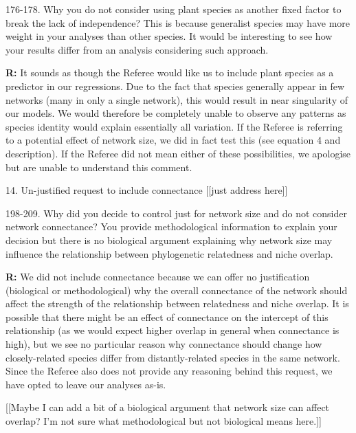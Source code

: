 \documentclass[12pt]{letter}
\newenvironment{refquote}{\bigskip \begin{it}}{\end{it}\smallskip}
\begin{document}
		\begin{refquote}
			176-178. Why you do not consider using plant species as another fixed factor to break the lack of independence? This is because generalist species may have more weight in your analyses than other species. It would be interesting to see how your results differ from an analysis considering such approach.
		\end{refquote}

		\textbf{R:} It sounds as though the Referee would like us to include plant species as a predictor in our regressions. Due to the fact that species generally appear in few networks (many in only a single network), this would result in near singularity of our models. We would therefore be completely unable to observe any patterns as species identity would explain essentially all variation. If the Referee is referring to a potential effect of network size, we did in fact test this (see equation 4 and description). If the Referee did not mean either of these possibilities, we apologise but are unable to understand this comment.


	14. Un-justified request to include connectance [[just address here]]

		\begin{refquote}
			198-209. Why did you decide to control just for network size and do not consider network connectance? You provide methodological information to explain your decision but there is no biological argument explaining why network size may influence the relationship between phylogenetic relatedness and niche overlap.
		\end{refquote}

		\textbf{R:} We did not include connectance because we can offer no justification (biological or methodological) why the overall connectance of the network should affect the strength of the relationship between relatedness and niche overlap. It is possible that there might be an effect of connectance on the intercept of this relationship (as we would expect higher overlap in general when connectance is high), but we see no particular reason why connectance should change how closely-related species differ from distantly-related species in the same network. Since the Referee also does not provide any reasoning behind this request, we have opted to leave our analyses as-is.


		[[Maybe I can add a bit of a biological argument that network size can affect overlap? I'm not sure what methodological but not biological means here.]]
\end{document}
